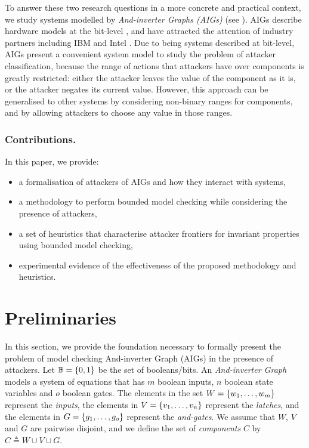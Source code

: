 {\color{red}
To answer these two research questions in a more concrete and practical context, we study systems modelled by \emph{And-inverter Graphs (AIGs)} (see  \cite{AIGs,AIGs2}). AIGs describe hardware models at the bit-level \cite{AIGER}, and have attracted the attention of industry partners including IBM and Intel \cite{HWMCC2014BM}. Due to being systems described at bit-level, AIGs present a convenient system model to study the problem of attacker classification, because the range of actions that attackers have over components is greatly restricted: either the attacker leaves the value of the component as it is, or the attacker negates its current value. However, this approach can be generalised to other systems by considering non-binary ranges for components, and by allowing attackers to choose any value in those ranges.

\subsubsection{Contributions.} In this paper, we provide:
\begin{itemize}
\item a formalisation of attackers of AIGs and how they interact with systems, 
\item a methodology to perform bounded model checking while considering the presence of attackers,
\item a set of heuristics that characterise attacker frontiers for invariant properties using bounded model checking,
\item experimental evidence of the effectiveness of the proposed methodology and heuristics.
\end{itemize}
\section{Preliminaries}
\label{sec:preliminaries}
In this section, we provide the foundation necessary to formally present 
the problem of model checking {And-inverter Graph} (AIGs) in the presence of attackers. 
Let $\mathbb{B}=\left\{0,1\right\}$ be the set of booleans/bits. An \emph{And-inverter Graph} 
models a system of equations that has $m$ boolean 
inputs, $n$ boolean state variables and $o$ boolean gates. The elements in the set 
$W=\left\{w_1, \ldots, w_m\right\}$ represent the \emph{inputs}, the elements in 
$V=\left\{v_1, \ldots, v_n\right\}$ represent the \emph{latches}, and the elements in 
$G=\left\{g_1, \ldots, g_o\right\}$ represent the \emph{and-gates}. We assume that $W$, $V$ and $G$ are pairwise disjoint, and we define the set of \emph{components} $C$ by $C\triangleq W\cup V \cup G$. 

}
